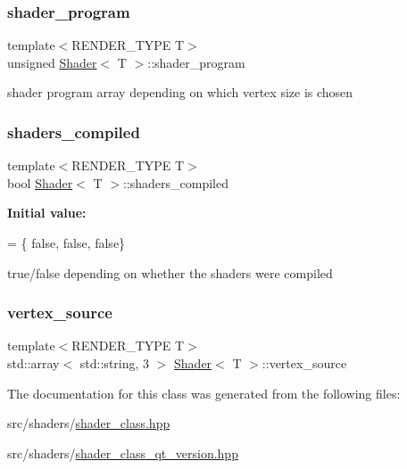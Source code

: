 \subsubsection{\texorpdfstring{shader\+\_\+program}{shader\_program}}
{\footnotesize\ttfamily template$<$R\+E\+N\+D\+E\+R\+\_\+\+T\+Y\+PE T$>$ \\
unsigned \mbox{\hyperlink{classShader}{Shader}}$<$ T $>$\+::shader\+\_\+program\hspace{0.3cm}{\ttfamily [protected]}}

shader program array depending on which vertex size is chosen \mbox{\label{classShader_a7093008f0b76639b11867f30ef8d53d8}} 
\subsubsection{\texorpdfstring{shaders\+\_\+compiled}{shaders\_compiled}}
{\footnotesize\ttfamily template$<$R\+E\+N\+D\+E\+R\+\_\+\+T\+Y\+PE T$>$ \\
bool \mbox{\hyperlink{classShader}{Shader}}$<$ T $>$\+::shaders\+\_\+compiled\hspace{0.3cm}{\ttfamily [protected]}}

{\bfseries Initial value\+:}
\begin{DoxyCode}
= \{
        \textcolor{keyword}{false}, \textcolor{keyword}{false},
        \textcolor{keyword}{false}\}
\end{DoxyCode}
true/false depending on whether the shaders were compiled \mbox{\label{classShader_a518714107f154f95b3aa613c6db17cb4}} 
\subsubsection{\texorpdfstring{vertex\+\_\+source}{vertex\_source}}
{\footnotesize\ttfamily template$<$R\+E\+N\+D\+E\+R\+\_\+\+T\+Y\+PE T$>$ \\
std\+::array$<$ std\+::string, 3 $>$ \mbox{\hyperlink{classShader}{Shader}}$<$ T $>$\+::vertex\+\_\+source\hspace{0.3cm}{\ttfamily [protected]}}



The documentation for this class was generated from the following files\+:\begin{DoxyCompactItemize}
\item 
src/shaders/\mbox{\hyperlink{shader__class_8hpp}{shader\+\_\+class.\+hpp}}\item 
src/shaders/\mbox{\hyperlink{shader__class__qt__version_8hpp}{shader\+\_\+class\+\_\+qt\+\_\+version.\+hpp}}\end{DoxyCompactItemize}
